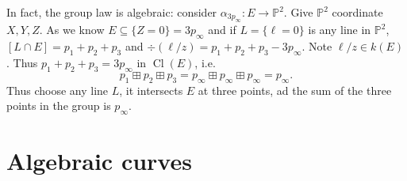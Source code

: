 \documentclass[a4paper]{article}
\DeclareMathOperator{\Cl}{Cl}
\renewcommand*{\P}{\mathbb{P}}
\begin{document}
In fact, the group law is algebraic: consider \(\alpha_{3p_\infty}: E \to \P^2\). Give \(\P^2\) coordinate \(X, Y, Z\). As we know \(E \subseteq \{Z = 0\} = 3p_\infty\) and if \(L = \{\ell = 0\}\) is any line in \(\P^2\), \([L \cap E] = p_1 + p_2 + p_3\) and \(\div(\ell/z) = p_1 + p_2 + p_3 - 3p_\infty\). Note \(\ell/z \in k(E)\). Thus \(p_1 + p_2 + p_3 = 3p_\infty\) in \(\Cl(E)\), i.e.
\[
  p_1 \boxplus p_2 \boxplus p_3 = p_\infty \boxplus p_\infty \boxplus p_\infty = p_\infty.
\]
Thus choose any line \(L\), it intersects \(E\) at three points, ad the sum of the three points in the group is \(p_\infty\).
























\iffalse

\section{Algebraic curves}
\end{document}
